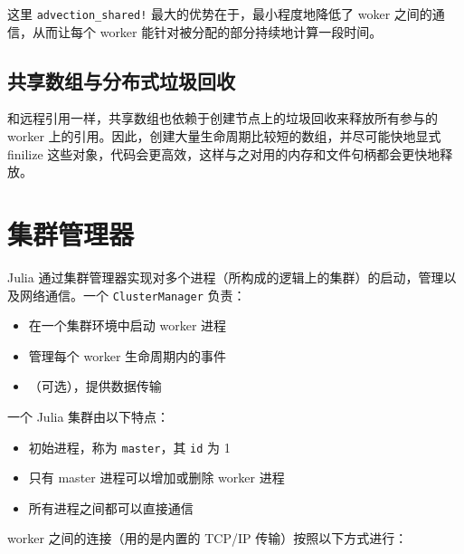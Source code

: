 这里 \texttt{advection\_shared!} 最大的优势在于，最小程度地降低了 woker 之间的通信，从而让每个 worker 能针对被分配的部分持续地计算一段时间。



\hypertarget{4244431560597105149}{}


\subsection{共享数组与分布式垃圾回收}



和远程引用一样，共享数组也依赖于创建节点上的垃圾回收来释放所有参与的 worker 上的引用。因此，创建大量生命周期比较短的数组，并尽可能快地显式 finilize 这些对象，代码会更高效，这样与之对用的内存和文件句柄都会更快地释放。



\hypertarget{9723253901891653661}{}


\section{集群管理器}



Julia 通过集群管理器实现对多个进程（所构成的逻辑上的集群）的启动，管理以及网络通信。一个 \texttt{ClusterManager} 负责：



\begin{itemize}
\item 在一个集群环境中启动 worker 进程


\item 管理每个 worker 生命周期内的事件


\item （可选），提供数据传输

\end{itemize}


一个 Julia 集群由以下特点：



\begin{itemize}
\item 初始进程，称为 \texttt{master}，其 \texttt{id} 为 1


\item 只有 master 进程可以增加或删除 worker 进程


\item 所有进程之间都可以直接通信

\end{itemize}


worker 之间的连接（用的是内置的 TCP/IP 传输）按照以下方式进行：



